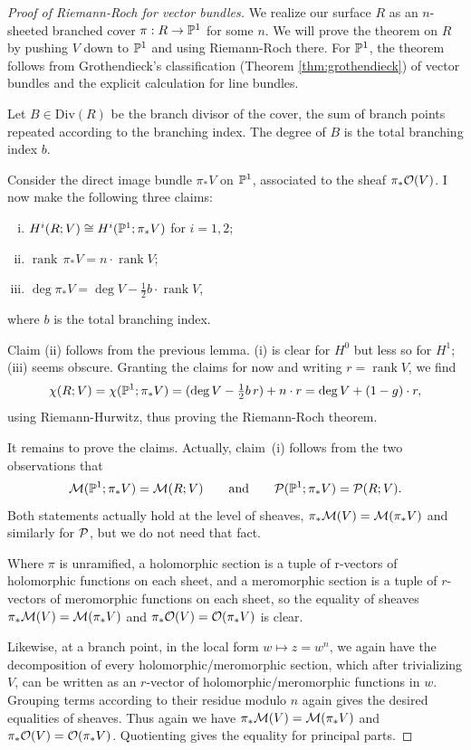 \documentclass[12pt]{article}
\begin{document}
\begin{proof}
    [Proof of Riemann-Roch for vector bundles]
We realize our surface $R$ as an $n$-sheeted branched cover 
$\pi : R \to \P^1$ for some $n$. 
We will prove the theorem on $R$ by pushing $V$ down to $\P^1$ 
and using Riemann-Roch there. For $\P^1$, the theorem follows from Grothendieck's classification (Theorem \ref{thm:grothendieck}) of vector bundles and the explicit calculation for line bundles. 

Let $B \in \mathrm{Div}(R)$ be the branch divisor of the cover, the sum of branch points repeated according to the branching index. The degree of $B$ is the total branching index $b$.

Consider the direct image bundle $\pi_*V$ on $\P^1$, associated to the sheaf $\pi_*\cO(V)$. 
I now make the following three claims:

\begin{enumerate}[(i)]
\item $H^i(R;V) \cong H^i(\P^1; \pi_*V)$ for $i=1,2$;
\item $\operatorname{rank}\,\pi_*V = n \cdot \operatorname{rank}V$;
\item $\deg\pi_*V = \deg V - \tfrac12 b \cdot \operatorname{rank}V$, 
\end{enumerate}
where $b$ is the total branching index.

Claim (ii) follows from the previous lemma.
(i) is clear for $H^0$ but less so for $H^1$; 
(iii) seems obscure.  
Granting the claims for now and writing $r = \operatorname{rank}V$, we find
\[
\chi(R;V) = \chi(\P^1;\pi_*V)
= (\deg V - \tfrac12 b\,r) + n\cdot r 
= \deg V + (1-g)\cdot r,
\]
using Riemann-Hurwitz, thus proving the Riemann-Roch theorem.

It remains to prove the claims.  
Actually, claim~(i) follows from the two observations that
\[
\cM(\P^1;\pi_*V) = \cM(R;V)
\qquad\text{and}\qquad
\cP(\P^1;\pi_*V) = \cP(R;V).
\]
Both statements actually hold at the level of sheaves, 
$\pi_* \cM(V) = \cM(\pi_*V)$ and similarly for $\cP$, 
but we do not need that fact.

Where $\pi$ is unramified, a holomorphic section is a tuple of r-vectors of holomorphic functions on each sheet, and a meromorphic section is a tuple of $r$-vectors of meromorphic functions on each sheet, so the equality of sheaves $\pi_* \cM(V) = \cM(\pi_*V)$ and $\pi_* \cO(V) = \cO(\pi_*V)$ is clear. 

Likewise, at a branch point, in the local form $w \mapsto z = w^n$, we again have the decomposition of every holomorphic/meromorphic section, which after trivializing $V$, can be written as an $r$-vector of holomorphic/meromorphic functions in $w$. Grouping terms according to their residue modulo $n$ again gives the desired equalities of sheaves. Thus again we have $\pi_* \cM(V) = \cM(\pi_*V)$ and $\pi_* \cO(V) = \cO(\pi_*V)$. Quotienting gives the equality for principal parts.


\end{proof}
\end{document}
